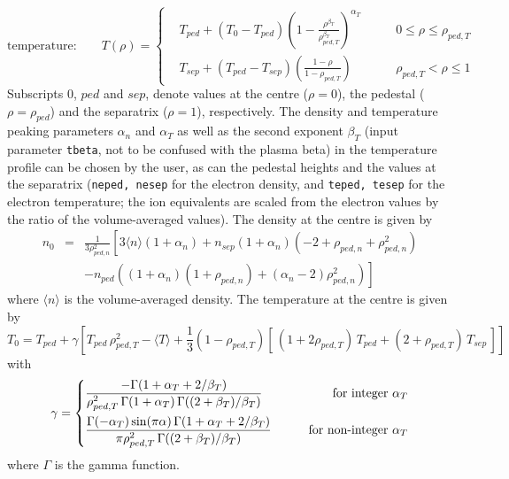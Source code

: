 \documentclass[11pt,a4paper]{report}
\begin{document}
\begin{equation}
\mbox{temperature:} \qquad T(\rho) = \left\{ 
\begin{aligned}
  &T_{ped} + (T_0 - T_{ped}) \left( 1 - \frac{\rho^{\beta_T}}
    {\rho_{ped,T}^{\beta_T}}\right)^{\alpha_T} &\qquad 0 \leq \rho \leq \rho_{ped,T} \\
  &T_{sep} + (T_{ped} - T_{sep})\left( \frac{1- \rho}{1-\rho_{ped,T}}\right)
  &\qquad \rho_{ped,T} < \rho \leq 1
\end{aligned}
\right.
\end{equation}
Subscripts $0$, $ped$ and $sep$, denote values at the centre ($\rho = 0$), the
pedestal ($\rho = \rho_{ped}$) and the separatrix ($\rho=1$),
respectively. The density and temperature peaking parameters $\alpha_n$ and
$\alpha_T$ as well as the second exponent $\beta_T$ (input parameter
\texttt{tbeta}, not to be confused with the plasma beta) in the temperature
profile can be chosen by the user, as can the pedestal heights and the values
at the separatrix (\texttt{neped, nesep} for the electron density, and
\texttt{teped, tesep} for the electron temperature; the ion equivalents are
scaled from the electron values by the ratio of the volume-averaged values).
The density at the centre is given by
\begin{eqnarray}
  \nonumber
  n_0 &= & \frac{1}{3\rho_{ped,n}^2} \left[3\langle n\rangle (1+\alpha_n)
    + n_{sep} (1+\alpha_n) (-2 + \rho_{ped,n} + \rho_{ped,n}^2) \right.\\
  && \left. - n_{ped}\left( (1 + \alpha_n)(1+ \rho_{ped,n}) + (\alpha_n -2)
    \rho_{ped,n}^2 \right) \right]
\end{eqnarray}
where $\langle n \rangle$ is the volume-averaged density. The temperature at
the centre is given by
\begin{equation}
T_0 = T_{ped} + \gamma \left[ T_{ped}\, \rho_{ped,T}^2 - \langle T \rangle +
  \frac{1}{3}(1 - \rho_{ped,T}) \left[ \, (1 + 2\rho_{ped,T}) \, T_{ped} + ( 2 +
    \rho_{ped,T}) \, T_{sep} \, \right] \right]
\end{equation}
with 
\begin{equation}
\gamma = \left\{ 
\begin{aligned}
  &\frac{ -\Gamma(1+\alpha_T+2/\beta_T)}
  {\rho_{ped,T}^2 \, \Gamma(1+\alpha_T) \, \Gamma((2+\beta_T)/\beta_T)}
  &\qquad \textnormal{for integer } \alpha_T \\
  &\frac{\Gamma(-\alpha_T)\sin(\pi\alpha)\, \Gamma(1+\alpha_T+2/\beta_T)}
  {\pi\rho_{ped,T}^2 \, \Gamma((2+\beta_T)/\beta_T)}
  &\qquad \textnormal{for non-integer } \alpha_T
\end{aligned}
\right.
\end{equation}
where $\Gamma$ is the gamma function.
\end{document}
